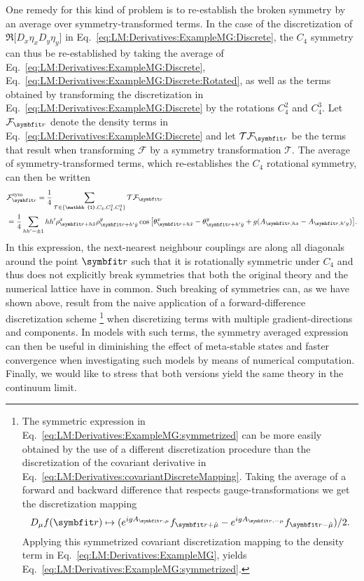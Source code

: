 One remedy for this kind of problem is to re-establish the broken symmetry by an average over symmetry-transformed terms. In the case of the discretization of
$\Re\big[D_x\eta_xD_y\eta_y\big]$ in Eq.~\eqref{eq:LM:Derivatives:ExampleMG:Discrete}, the $C_4$ symmetry can thus be re-established by taking the average of 
Eq.~\eqref{eq:LM:Derivatives:ExampleMG:Discrete},
Eq.~\eqref{eq:LM:Derivatives:ExampleMG:Discrete:Rotated}, as well as the terms obtained by transforming the discretization in Eq.~\eqref{eq:LM:Derivatives:ExampleMG:Discrete}
by the rotations $C_4^2$ and $C_4^3$. Let $\mathcal{F}_\v{r}$ denote the density terms in Eq.~\eqref{eq:LM:Derivatives:ExampleMG:Discrete} and let $\mathcal{T}\mathcal{F}_\v{r}$
be the terms that result when transforming $\mathcal{F}$ by a symmetry transformation $\mathcal{T}$. The average of symmetry-transformed terms, which re-establishes the $C_4$
rotational symmetry, can then be written
\begin{equation}
    \label{eq:LM:Derivatives:ExampleMG:symmetrized}
    \begin{split}
        &\mathcal{F}_\v{r}^{\text{sym}} = \frac{1}{4}\sum_{\mathcal{T}\in\{\mathbb{1},C_4,C_4^2,C_4^3\}}\mathcal{T}\mathcal{F}_\v{r}\\
        &= \frac{1}{4}\sum_{hh'=\pm 1}hh'\rho^x_{\v{r}+h\hat{x}}\rho^y_{\v{r}+h'\hat{y}}\cos\big[\theta^x_{\v{r}+h\hat{x}}-\theta^y_{\v{r}+h'\hat{y}}+g(A_{\v{r},hx}-A_{\v{r},h'y})\big].
    \end{split}
\end{equation}
In this expression, the next-nearest neighbour couplings are along all diagonals around the point $\v{r}$ such that it is rotationally symmetric under $C_4$ and thus does not
explicitly break symmetries that both the original theory and the numerical lattice have in common. Such breaking of symmetries can, as we have shown above,
result from the naive application of a forward-difference discretization scheme%
\footnote{The symmetric expression in Eq.~\eqref{eq:LM:Derivatives:ExampleMG:symmetrized} can be more easily obtained by the use of a different discretization procedure than
the discretization of the covariant derivative in Eq.~\eqref{eq:LM:Derivatives:covariantDiscreteMapping}. Taking the average of a forward and backward difference that
respects gauge-transformations we get the discretization mapping
\begin{equation*}
    D_\mu f(\v{r})\mapsto (e^{igA_{\v{r},\mu}}f_{\v{r}+\hat{\mu}}-e^{igA_{\v{r},-\mu}}f_{\v{r}-\hat{\mu}})/2.
\end{equation*}
Applying this symmetrized covariant discretization mapping to the density term in Eq.~\eqref{eq:LM:Derivatives:ExampleMG}, yields Eq.~\eqref{eq:LM:Derivatives:ExampleMG:symmetrized}.
} %
  when discretizing terms with multiple gradient-directions and components. In models with such terms, the symmetry averaged expression can then be useful in diminishing the effect of 
meta-stable states and faster convergence when investigating such models by means of numerical computation. Finally, we would like to stress that both versions yield the same theory
in the continuum limit.

